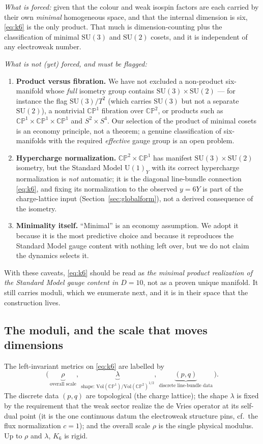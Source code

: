 \documentclass[11pt]{article}
\theoremstyle{plain}
\theoremstyle{definition}
\newcommand{\SU}{\mathrm{SU}}
\newcommand{\U}{\mathrm{U}}
\begin{document}
\emph{What is forced:} given that the colour and weak isospin factors are each
carried by their own \emph{minimal} homogeneous space, and that the internal
dimension is six, \eqref{eq:k6} is the only product. That much is
dimension-counting plus the classification of minimal $\SU(3)$ and $\SU(2)$
cosets, and it is independent of any electroweak number.

\emph{What is not (yet) forced, and must be flagged:}
\begin{enumerate}
\item \textbf{Product versus fibration.} We have not excluded a non-product
six-manifold whose \emph{full} isometry group contains
$\SU(3)\times\SU(2)$ --- for instance the flag $\SU(3)/T^2$ (which carries
$\SU(3)$ but not a separate $\SU(2)$), a nontrivial $\mathbb{CP}^1$ fibration
over $\mathbb{CP}^2$, or products such as
$\mathbb{CP}^1\times\mathbb{CP}^1\times\mathbb{CP}^1$ and $S^2\times S^4$. Our
selection of the product of minimal cosets is an economy principle, not a
theorem; a genuine classification of six-manifolds with the required
\emph{effective} gauge group is an open problem.
\item \textbf{Hypercharge normalization.} $\mathbb{CP}^2\times\mathbb{CP}^1$
has manifest $\SU(3)\times\SU(2)$ isometry, but the Standard Model
$\U(1)_Y$ with its correct hypercharge normalization is \emph{not} automatic;
it is the diagonal line-bundle connection \eqref{eq:k6}, and fixing its
normalization to the observed $y=6Y$ is part of the charge-lattice input
(Section~\ref{sec:globalform}), not a derived consequence of the isometry.
\item \textbf{Minimality itself.} ``Minimal'' is an economy assumption. We
adopt it because it is the most predictive choice and because it reproduces
the Standard Model gauge content with nothing left over, but we do not claim
the dynamics selects it.
\end{enumerate}
With these caveats, \eqref{eq:k6} should be read as \emph{the minimal product
realization of the Standard Model gauge content in $D=10$}, not as a proven
unique manifold. It still carries moduli, which we enumerate next, and it is
in their space that the construction lives.

\subsection{The moduli, and the scale that moves dimensions}
\label{sec:moduli}

The left-invariant metrics on \eqref{eq:k6} are labelled by
\begin{equation}
\bigl(\,\underbrace{\rho}_{\text{overall scale}},\ \underbrace{\lambda}_{\text{shape: }\mathrm{Vol}(\mathbb{CP}^1)/\mathrm{Vol}(\mathbb{CP}^2)^{1/2}},\ \underbrace{(p,q)}_{\text{discrete line-bundle data}}\,\bigr).
\end{equation}
The discrete data $(p,q)$ are topological (the charge lattice); the shape
$\lambda$ is fixed by the requirement that the weak sector realize the de
Vries operator at its self-dual point (it is the one continuous datum the
electroweak structure pins, cf.\ the flux normalization $c=1$); and the
overall scale $\rho$ is the single physical modulus. Up to $\rho$ and
$\lambda$, $K_6$ is rigid.
\end{document}
